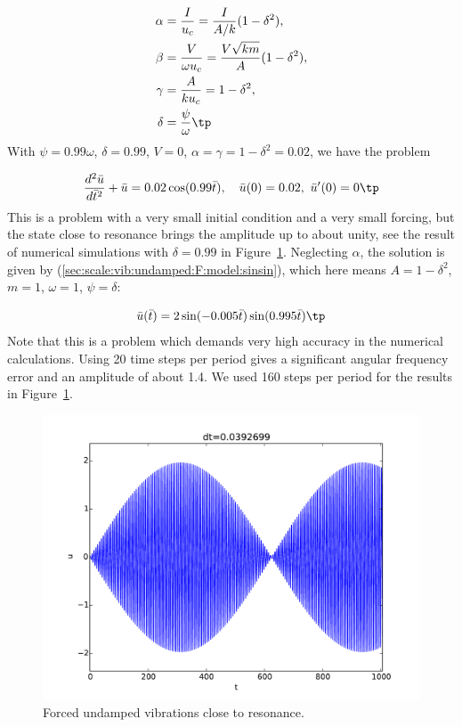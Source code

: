 \documentclass[graybox,envcountchap,sectrefs,final]{svmonodo}
\begin{document}
\begin{align*}
\alpha &= \frac{I}{u_c} = \frac{I}{A/k}(1-\delta^2),\\ 
\beta  &= \frac{V}{\omega u_c} = \frac{V\sqrt{km}}{A}(1-\delta^2),\\ 
\gamma &= \frac{A}{ku_c} = 1-\delta^2,\\ 
\delta &= \frac{\psi}{\omega}\tp
\end{align*}
With $\psi = 0.99\omega$, $\delta =0.99$, $V=0$,
$\alpha = \gamma = 1-\delta^2 = 0.02$, we have the problem

\[
\frac{d^2\bar u}{d\bar t^2} + \bar u =
0.02 \cos(0.99\bar t),
\quad \bar u(0)=0.02,\ \bar u'(0)=0\tp
\]
This is a problem with a very small initial condition and a very small
forcing, but the state close to resonance brings the amplitude up to
about unity, see the result of numerical simulations with $\delta=0.99$ in
Figure~\ref{sec:scale:vib:fig:Fcos_b0:1}.
Neglecting $\alpha$,
the solution is given by (\ref{sec:scale:vib:undamped:F:model:sinsin}),
which here means $A=1-\delta^2$, $m=1$, $\omega=1$, $\psi=\delta$:

\[ \bar u(\bar t) = 2\sin(-0.005\bar t)\sin(0.995\bar t)\tp \]
Note that this is a problem which demands very high accuracy in the
numerical calculations. Using 20 time steps per period gives a
significant angular frequency error and an amplitude of about 1.4. We used
160 steps per period for the results in
Figure~\ref{sec:scale:vib:fig:Fcos_b0:1}.


\begin{figure}[!ht]  %
  \centerline{\includegraphics[width=1.0\linewidth]{fig-scaling/vib_delta099_b0_Fcos.pdf}}
  \caption{
  Forced undamped vibrations close to resonance. \label{sec:scale:vib:fig:Fcos_b0:1}
  }
\end{figure}
\end{document}
